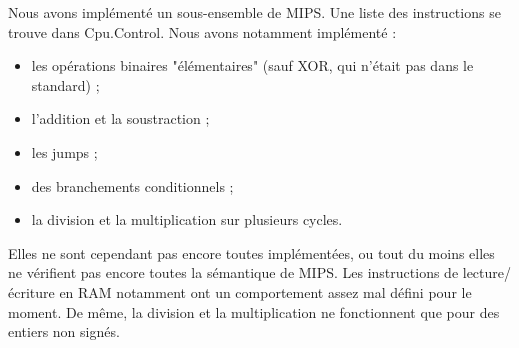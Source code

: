 Nous avons implémenté un sous-ensemble de MIPS.
Une liste des instructions se trouve dans Cpu.Control.
Nous avons notamment implémenté :
\begin{itemize}
\item les opérations binaires "élémentaires" (sauf XOR, qui n'était pas dans le standard) ;
\item l'addition et la soustraction ;
\item les jumps ;
\item des branchements conditionnels ;
\item la division et la multiplication sur plusieurs cycles.
\end{itemize}
Elles ne sont cependant pas encore toutes implémentées, ou tout du moins elles ne vérifient
pas encore toutes la sémantique de MIPS.
Les instructions de lecture/écriture en RAM notamment ont un comportement assez mal défini pour
le moment. De même, la division et la multiplication ne fonctionnent que pour des entiers
non signés.
